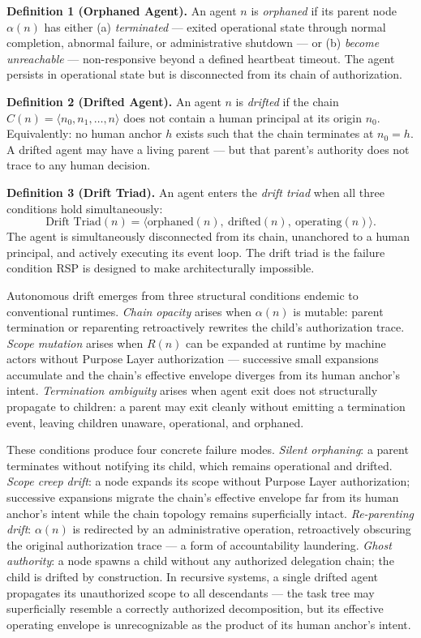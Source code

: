 \medskip
\noindent\textbf{Definition 1 (Orphaned Agent).} An agent $n$ is \emph{orphaned} if its parent node $\alpha(n)$ has either (a) \emph{terminated} — exited operational state through normal completion, abnormal failure, or administrative shutdown — or (b) \emph{become unreachable} — non-responsive beyond a defined heartbeat timeout. The agent persists in operational state but is disconnected from its chain of authorization.

\medskip
\noindent\textbf{Definition 2 (Drifted Agent).} An agent $n$ is \emph{drifted} if the chain $C(n) = \langle n_0, n_1, \ldots, n \rangle$ does not contain a human principal at its origin $n_0$. Equivalently: no human anchor $h$ exists such that the chain terminates at $n_0 = h$. A drifted agent may have a living parent — but that parent's authority does not trace to any human decision.

\medskip
\noindent\textbf{Definition 3 (Drift Triad).} An agent enters the \emph{drift triad} when all three conditions hold simultaneously:
\begin{equation}
\text{Drift Triad}(n) = \bigl\langle \text{orphaned}(n),\ \text{drifted}(n),\ \text{operating}(n) \bigr\rangle .
\label{eq:intro-drift-triad}
\end{equation}
The agent is simultaneously disconnected from its chain, unanchored to a human principal, and actively executing its event loop. The drift triad is the failure condition RSP is designed to make architecturally impossible.

Autonomous drift emerges from three structural conditions endemic to conventional runtimes. \emph{Chain opacity} arises when $\alpha(n)$ is mutable: parent termination or reparenting retroactively rewrites the child's authorization trace. \emph{Scope mutation} arises when $R(n)$ can be expanded at runtime by machine actors without Purpose Layer authorization — successive small expansions accumulate and the chain's effective envelope diverges from its human anchor's intent. \emph{Termination ambiguity} arises when agent exit does not structurally propagate to children: a parent may exit cleanly without emitting a termination event, leaving children unaware, operational, and orphaned.

These conditions produce four concrete failure modes. \emph{Silent orphaning}: a parent terminates without notifying its child, which remains operational and drifted. \emph{Scope creep drift}: a node expands its scope without Purpose Layer authorization; successive expansions migrate the chain's effective envelope far from its human anchor's intent while the chain topology remains superficially intact. \emph{Re-parenting drift}: $\alpha(n)$ is redirected by an administrative operation, retroactively obscuring the original authorization trace — a form of accountability laundering. \emph{Ghost authority}: a node spawns a child without any authorized delegation chain; the child is drifted by construction. In recursive systems, a single drifted agent propagates its unauthorized scope to all descendants — the task tree may superficially resemble a correctly authorized decomposition, but its effective operating envelope is unrecognizable as the product of its human anchor's intent.

